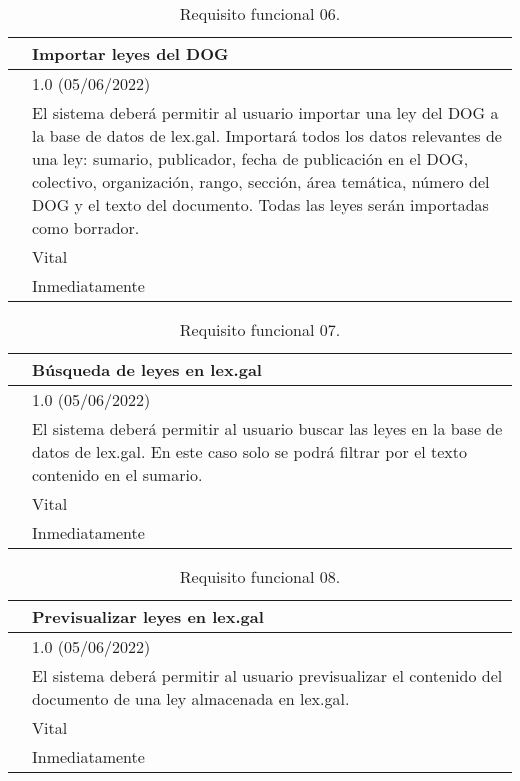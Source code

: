 \begin{table}[H]
\begin{center}
\begin{tabular}{|p{3cm}|p{10cm}|} \hline
\centering {\bf FRQ-06} & Importar leyes del DOG  \\ \hline\hline
\centering {\bf Versión} & 1.0 (05/06/2022) \\ \hline
\centering {\bf Descripción} & El sistema deberá permitir al usuario importar una ley del DOG a la base de datos de lex.gal. Importará todos los datos relevantes de una ley: sumario, publicador, fecha de publicación en el DOG, colectivo, organización, rango, sección, área temática, número del DOG y el texto del documento. Todas las leyes serán importadas como borrador. \\ \hline
\centering {\bf Importancia} & Vital \\ \hline
\centering {\bf Urgencia} & Inmediatamente \\ \hline
\end{tabular}
\caption{Requisito funcional 06.}
\label{enlaceFRQ6}
\end{center}
\end{table}

\begin{table}[H]
\begin{center}
\begin{tabular}{|p{3cm}|p{10cm}|} \hline
\centering {\bf FRQ-07} & Búsqueda de leyes en lex.gal  \\ \hline\hline
\centering {\bf Versión} & 1.0 (05/06/2022) \\ \hline
\centering {\bf Descripción} & El sistema deberá permitir al usuario buscar las leyes en la base de datos de lex.gal. En este caso solo se podrá filtrar por el texto contenido en el sumario. \\ \hline
\centering {\bf Importancia} & Vital \\ \hline
\centering {\bf Urgencia} & Inmediatamente \\ \hline
\end{tabular}
\caption{Requisito funcional 07.}
\label{enlaceFRQ7}
\end{center}
\end{table}

\begin{table}[H]
\begin{center}
\begin{tabular}{|p{3cm}|p{10cm}|} \hline
\centering {\bf FRQ-08} & Previsualizar leyes en lex.gal  \\ \hline\hline
\centering {\bf Versión} & 1.0 (05/06/2022) \\ \hline
\centering {\bf Descripción} & El sistema deberá permitir al usuario previsualizar el contenido del documento de una ley almacenada en lex.gal. \\ \hline
\centering {\bf Importancia} & Vital \\ \hline
\centering {\bf Urgencia} & Inmediatamente \\ \hline
\end{tabular}
\caption{Requisito funcional 08.}
\label{enlaceFRQ8}
\end{center}
\end{table}

